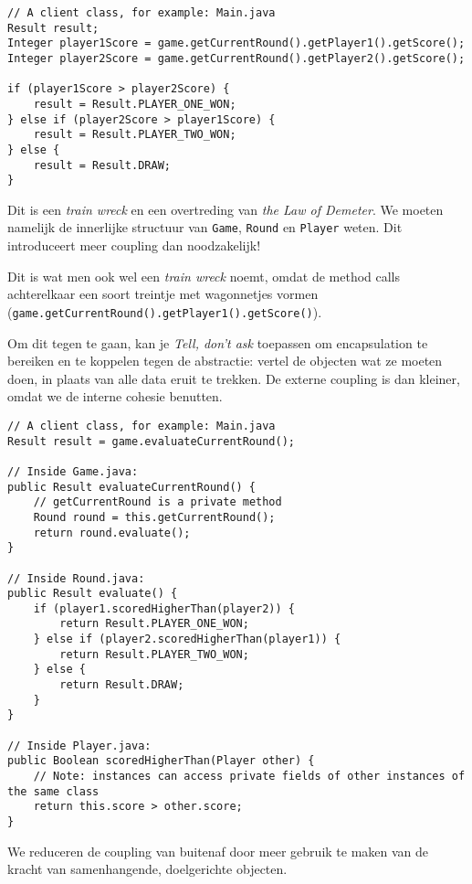 \begin{listing}[H]
\begin{verbatim}
// A client class, for example: Main.java
Result result;
Integer player1Score = game.getCurrentRound().getPlayer1().getScore();
Integer player2Score = game.getCurrentRound().getPlayer2().getScore();

if (player1Score > player2Score) {
    result = Result.PLAYER_ONE_WON;
} else if (player2Score > player1Score) {
    result = Result.PLAYER_TWO_WON;
} else {
    result = Result.DRAW;
}
\end{verbatim}
\caption{Dit is een \textit{train wreck} en een overtreding van \textit{the Law of Demeter}.
We moeten namelijk de innerlijke structuur van \texttt{Game}, \texttt{Round} en \texttt{Player} weten.
Dit introduceert meer coupling dan noodzakelijk!}
\label{code:train-wreck}
\end{listing}

Dit is wat men ook wel een 
\textit{train wreck} noemt, omdat de method calls achterelkaar een soort 
treintje met wagonnetjes vormen (\texttt{game.getCurrentRound().getPlayer1().getScore()}).

Om dit tegen te gaan, kan je \textit{Tell, don't ask} toepassen 
om encapsulation te bereiken en te koppelen tegen de abstractie: 
vertel de objecten wat ze moeten doen, in plaats van alle data eruit te trekken.
De externe coupling is dan kleiner, omdat we de interne cohesie benutten.

\begin{listing}[H]
\begin{verbatim}
// A client class, for example: Main.java
Result result = game.evaluateCurrentRound();

// Inside Game.java:
public Result evaluateCurrentRound() {
    // getCurrentRound is a private method
    Round round = this.getCurrentRound();
    return round.evaluate();
}

// Inside Round.java:
public Result evaluate() {
    if (player1.scoredHigherThan(player2)) {
        return Result.PLAYER_ONE_WON;
    } else if (player2.scoredHigherThan(player1)) {
        return Result.PLAYER_TWO_WON;
    } else {
        return Result.DRAW;
    }
}

// Inside Player.java:
public Boolean scoredHigherThan(Player other) {
    // Note: instances can access private fields of other instances of the same class
    return this.score > other.score;
}

\end{verbatim}
\caption{We reduceren de coupling van buitenaf door meer gebruik te maken van de 
kracht van samenhangende, doelgerichte objecten.}
\label{code:train-wreck-solution}
\end{listing}

